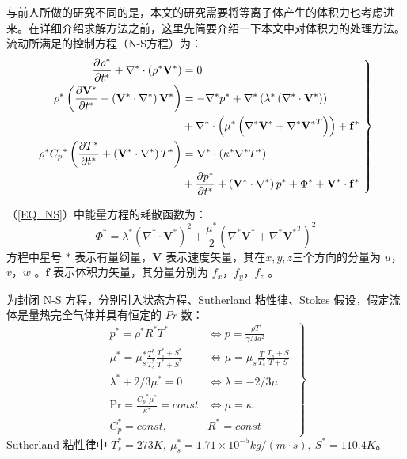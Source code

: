 与前人所做的研究不同的是，本文的研究需要将等离子体产生的体积力也考虑进来。在详细介绍求解方法之前，这里先简要介绍一下本文中对体积力的处理方法。流动所满足的控制方程（N-S方程）为：
\begin{equation}\label{EQ_NS}\left.
\begin{aligned}
    \frac{\partial{\rho^*}}{\partial{t^*}}
    + {\nabla^*}\cdot\left({\rho^*}{\mathbf{V}^*}\right) & =0
    \\
    {\rho^*}\left( {\frac{\partial{\mathbf{V}^*}}{\partial{t^*}}
    + \left( {{\mathbf{V}^*}\cdot{\nabla^*}}\right)
    {\mathbf{V}^*}} \right) & =
     - {\nabla^*}{p^*} + {\nabla^*}\left( {{\lambda ^*}\left( {{\nabla ^*} \cdot {\mathbf{V}^*}} \right)} \right) \\
    & + {\nabla ^*} \cdot \left( {{\mu ^*}\left( {{\nabla ^*}{\mathbf{V}^*} + {\nabla ^*}{\mathbf{V}^*}^T} \right)} \right) + \mathbf{f}^*
    \\
    {\rho ^*}{C_p}^*\left( {\frac{{\partial{T^*}}}{{\partial{t^*}}} + \left( {{{\mathbf{V}}^*} \cdot {\nabla ^*}} \right){T^*}} \right) & =
    {\nabla ^*} \cdot \left( {{\kappa ^*}{\nabla ^*}{T^*}} \right) \\
    & + \frac{{\partial{p^*}}}{{\partial{t^*}}} + \left( {{{\mathbf{V}}^*} \cdot {\nabla ^*}} \right){p^*} + {\Phi ^*} + \mathbf{V}^* \cdot \mathbf{f}^*
\end{aligned}~\right\}
\end{equation}

（\ref{EQ_NS}）中能量方程的耗散函数为：
\begin{equation}
    {\Phi ^*} = {\lambda ^*}{{\left( {{\nabla ^*} \cdot {{{\mathbf{V}}}^*}} \right)}^2} + \frac{{{\mu ^*}}}{2}{{\left( {{\nabla ^*}{{{\mathbf{V}}}^*} + {\nabla ^*}{{{\mathbf{V}}}^*}^T} \right)}^2}
\end{equation}
方程中星号 $*$ 表示有量纲量，${\mathbf{V}}$ 表示速度矢量，其在$x,y,z$三个方向的分量为 $u$，$v$，$w$ 。${\mathbf{f}}$ 表示体积力矢量，其分量分别为 $f_x$，$f_y$，$f_z$ 。

为封闭 N-S 方程，分别引入状态方程、Sutherland 粘性律、Stokes 假设，假定流体是量热完全气体并具有恒定的 $Pr$ 数：
\begin{equation}\left.
\begin{aligned}
p^*=\rho^*R^*T^* & \Leftrightarrow p=\frac{\rho T}{\gamma Ma^2} \\
\mu^*=\mu_s^*\frac{T^*}{T^*_s}\frac{T^*_s+S^*}{T^*+S^*} & \Leftrightarrow \mu=\mu_s\frac{T}{T_s}\frac{T_s+S}{T+S} \\
\lambda^*+2/3\mu^*=0 & \Leftrightarrow\lambda=-2/3\mu\\
\textrm{Pr}=\frac{{C_p}^*\mu^*}{\kappa^*}={const} & \Leftrightarrow\mu=\kappa\\
C_p^*=const,~ & R^*=const
\end{aligned}~\right\}
\end{equation}
Sutherland 粘性律中 $T^*_s=273K,~\mu_s^*=1.71\times10^{-5}kg/(m\cdot s),~S^*=110.4K$。

